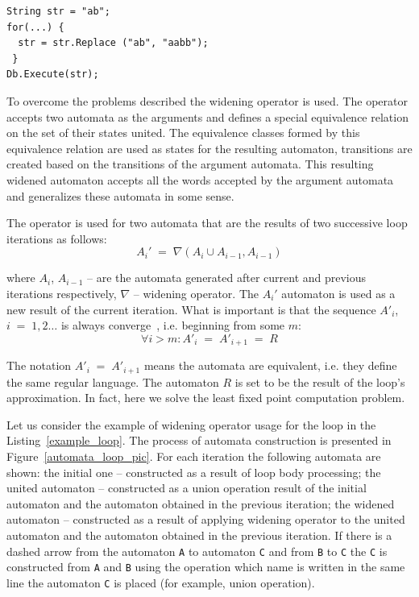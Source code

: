 \begin{lstlisting}[label=classic_example,caption=Loop with a replace operation in C\#]
String str = "ab";
for(...) {
  str = str.Replace ("ab", "aabb");
 }     	
Db.Execute(str);
\end{lstlisting}

To overcome the problems described the widening operator is used. The operator accepts two automata as the arguments and defines a special equivalence relation on the set of their states united. The equivalence classes formed by this equivalence relation are used as states for the resulting automaton, transitions are created based on the transitions of the argument automata. This resulting widened automaton accepts all the words accepted by the argument automata and generalizes these automata in some sense.

The operator is used for two automata that are the results of two successive loop iterations as follows:
$$
A_i' \;=\; \nabla (A_i \cup A_{i-1}, A_{i-1})
$$

where $A_i$, $A_{i-1}$ -- are the automata generated after current and previous iterations respectively, $\nabla$ -- widening operator. The $A_i'$ automaton is used as a new result of the current iteration. What is important is that the sequence $A'_i$, $i \;=\; 1, 2 \ldots$ is always converge~\cite{Upper_Approximation:ref}, i.e. beginning from some $m$:
$$
\forall i > m \colon A'_i \;=\; A'_{i+1} \;=\; R
$$

The notation  $A'_i \;=\; A'_{i+1}$ means the automata are equivalent, i.e. they define the same regular language. The automaton $R$ is set to be the result of the loop's approximation. In fact, here we solve the least fixed point computation problem.

Let us consider the example of widening operator usage for the loop in the Listing~\ref{example_loop}. The process of automata construction is presented in Figure~\ref{automata_loop_pic}. For each iteration the following automata are shown: the initial one -- constructed as a result of loop body processing; the united automaton -- constructed as a union operation result of the initial automaton and the automaton obtained in the previous iteration; the widened automaton -- constructed as a result of applying widening operator to the united automaton and  the automaton obtained in the previous iteration. If there is a dashed arrow from the automaton \verb|A| to automaton \verb|C| and from \verb|B| to \verb|C| the \verb|C| is constructed from \verb|A| and \verb|B| using the operation which name is written in the same line the automaton \verb|C| is placed (for example, union operation).

